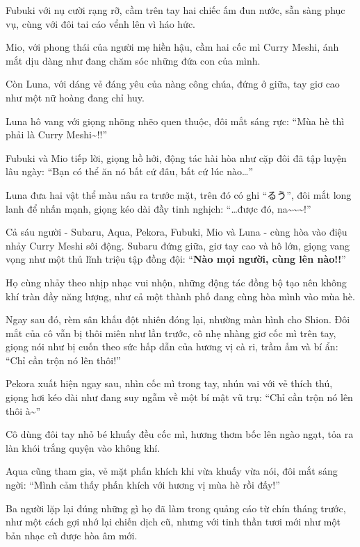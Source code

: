\documentclass[../main.tex]{subfiles}
\begin{document}
Fubuki với nụ cười rạng rỡ, cầm trên tay hai chiếc ấm đun nước, sẵn sàng phục vụ, cùng với đôi tai cáo vểnh lên vì háo hức.

Mio, với phong thái của người mẹ hiền hậu, cầm hai cốc mì Curry Meshi, ánh mắt dịu dàng như đang chăm sóc những đứa con của mình.

Còn Luna, với dáng vẻ đáng yêu của nàng công chúa, đứng ở giữa, tay giơ cao như một nữ hoàng đang chỉ huy.

Luna hô vang với giọng nhõng nhẽo quen thuộc, đôi mắt sáng rực: ``Mùa hè thì phải là Curry Meshi\~{}!!''

Fubuki và Mio tiếp lời, giọng hồ hởi, động tác hài hòa như cặp đôi đã tập luyện lâu ngày: ``Bạn có thể ăn nó bất cứ đâu, bất cứ lúc nào\dots''

Luna đưa hai vật thể màu nâu ra trước mặt, trên đó có ghi ``るう'', đôi mắt long lanh để nhấn mạnh, giọng kéo dài đầy tinh nghịch: ``\dots được đó, na\~{}\~{}\~{}!''


Cả sáu người - Subaru, Aqua, Pekora, Fubuki, Mio và Luna - cùng hòa vào điệu nhảy Curry Meshi sôi động. Subaru đứng giữa, giơ tay cao và hô lớn, giọng vang vọng như một thủ lĩnh triệu tập đồng đội: ``\textbf{Nào mọi người, cùng lên nào!!}''

Họ cùng nhảy theo nhịp nhạc vui nhộn, những động tác đồng bộ tạo nên không khí tràn đầy năng lượng, như cả một thành phố đang cùng hòa mình vào mùa hè.


Ngay sau đó, rèm sân khấu đột nhiên đóng lại, nhường màn hình cho Shion. Đôi mắt của cô vẫn bị thôi miên như lần trước, cô nhẹ nhàng giơ cốc mì trên tay, giọng nói như bị cuốn theo sức hấp dẫn của hương vị cà ri, trầm ấm và bí ẩn: ``Chỉ cần trộn nó lên thôi!''

Pekora xuất hiện ngay sau, nhìn cốc mì trong tay, nhún vai với vẻ thích thú, giọng hơi kéo dài như đang suy ngẫm về một bí mật vũ trụ: ``Chỉ cần trộn nó lên thôi à\~{}''

Cô dùng đôi tay nhỏ bé khuấy đều cốc mì, hương thơm bốc lên ngào ngạt, tỏa ra làn khói trắng quyện vào không khí.

Aqua cũng tham gia, vẻ mặt phấn khích khi vừa khuấy vừa nói, đôi mắt sáng ngời: ``Mình cảm thấy phấn khích với hương vị mùa hè rồi đấy!''

Ba người lặp lại đúng những gì họ đã làm trong quảng cáo từ chín tháng trước, như một cách gợi nhớ lại chiến dịch cũ, nhưng với tinh thần tươi mới như một bản nhạc cũ được hòa âm mới.
\end{document}
